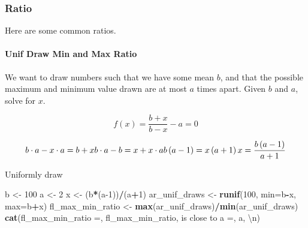 \documentclass[
]{book}
\newenvironment{Shaded}{\begin{snugshade}}{\end{snugshade}}
\newcommand{\CharTok}[1]{\textcolor[rgb]{0.31,0.60,0.02}{#1}}
\newcommand{\DataTypeTok}[1]{\textcolor[rgb]{0.13,0.29,0.53}{#1}}
\newcommand{\DecValTok}[1]{\textcolor[rgb]{0.00,0.00,0.81}{#1}}
\newcommand{\KeywordTok}[1]{\textcolor[rgb]{0.13,0.29,0.53}{\textbf{#1}}}
\newcommand{\NormalTok}[1]{#1}
\newcommand{\OperatorTok}[1]{\textcolor[rgb]{0.81,0.36,0.00}{\textbf{#1}}}
\newcommand{\StringTok}[1]{\textcolor[rgb]{0.31,0.60,0.02}{#1}}
\begin{document}
\hypertarget{ratio}{%
\subsubsection{Ratio}\label{ratio}}

Here are some common ratios.

\hypertarget{unif-draw-min-and-max-ratio}{%
\paragraph{Unif Draw Min and Max Ratio}\label{unif-draw-min-and-max-ratio}}

We want to draw numbers such that we have some mean \(b\), and that the possible maximum and minimum value drawn are at most \(a\) times apart. Given \(b\) and \(a\), solve for \(x\).

\[
f(x) = \frac{b+x}{b-x} - a = 0
\]

\[
b \cdot a - x \cdot a = b + x \\
b \cdot a - b = x + x \cdot a  \\
b \left(a - 1\right) = x \left( a+ 1\right)  \\
x = \frac{b\left(a-1\right)}{a+1}\\
\]

Uniformly draw

\begin{Shaded}
\begin{Highlighting}[]
\NormalTok{b \textless{}{-}}\StringTok{ }\DecValTok{100}
\NormalTok{a \textless{}{-}}\StringTok{ }\DecValTok{2}
\NormalTok{x \textless{}{-}}\StringTok{ }\NormalTok{(b}\OperatorTok{*}\NormalTok{(a}\DecValTok{{-}1}\NormalTok{))}\OperatorTok{/}\NormalTok{(a}\OperatorTok{+}\DecValTok{1}\NormalTok{)}
\NormalTok{ar\_unif\_draws \textless{}{-}}\StringTok{ }\KeywordTok{runif}\NormalTok{(}\DecValTok{100}\NormalTok{, }\DataTypeTok{min=}\NormalTok{b}\OperatorTok{{-}}\NormalTok{x, }\DataTypeTok{max=}\NormalTok{b}\OperatorTok{+}\NormalTok{x)}
\NormalTok{fl\_max\_min\_ratio \textless{}{-}}\StringTok{ }\KeywordTok{max}\NormalTok{(ar\_unif\_draws)}\OperatorTok{/}\KeywordTok{min}\NormalTok{(ar\_unif\_draws)}
\KeywordTok{cat}\NormalTok{(}\StringTok{\textquotesingle{}fl\_max\_min\_ratio =\textquotesingle{}}\NormalTok{, fl\_max\_min\_ratio, }\StringTok{\textquotesingle{}is close to a =\textquotesingle{}}\NormalTok{, a, }\StringTok{\textquotesingle{}}\CharTok{\textbackslash{}n}\StringTok{\textquotesingle{}}\NormalTok{)}
\end{Highlighting}
\end{Shaded}
\end{document}

